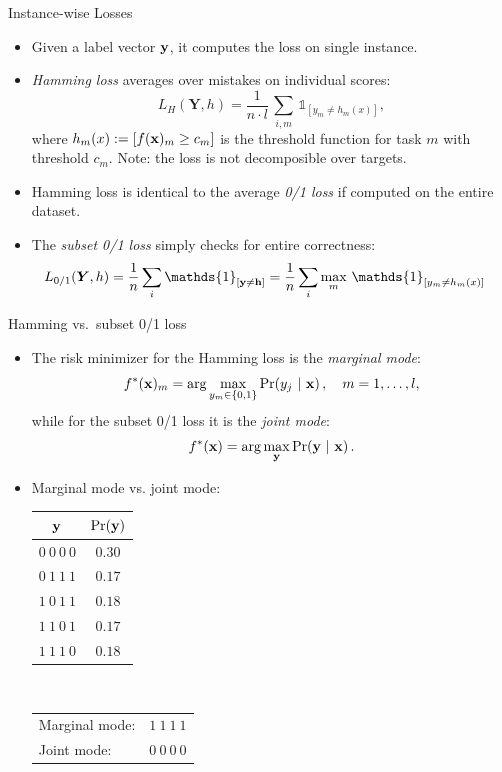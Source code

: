 \documentclass[11pt,compress,t,notes=noshow, xcolor=table]{beamer}
\begin{document}
\begin{frame}{Instance-wise Losses}
	\begin{itemize}
		
        \item Given a label vector $\mathbf{y}$, it computes the loss on single instance. 

		\item \emph{Hamming loss} averages over mistakes on individual scores:    
		$$
		\displaystyle L_H(\bm{Y}, h) = \frac{1}{n \cdot l}  \, \sum_{i, m} \, \mathds{1}_{[y_m \neq h_m(x)]},
		$$
        where $h_m(x) := [f(\mathbf{x})_m \geq c_m]$ is the threshold function for task $m$ with threshold $c_m$. Note: the loss is not decomposible over targets.
        
        \item Hamming loss is identical to the average \emph{0/1 loss} if computed on the entire dataset.

		
		\item The \emph{subset 0/1 loss} simply checks for entire correctness:  
		\begin{align*}
			\displaystyle L_{0/1}(\bm{Y}, h) & = \frac{1}{n} \sum_i \mathds{1}_{[ \yv \neq \mathbf{h} ]}  =  \frac{1}{n} \sum_i \max_m \, \mathds{1}_{[y_m \neq  h_m(x)]}
		\end{align*}
		
	\end{itemize}
\end{frame}


\begin{frame}{Hamming vs.\ subset 0/1 loss}
	\begin{itemize}
		\item The risk minimizer for the Hamming loss is the  \emph{marginal mode}:
		$$
		f^*(\mathbf{x})_m = \arg \max_{y_m \in \{0,1\}} \Pr( y_j  ~|~ \mathbf{x} )\,, \quad m = 1,\ldots,l,
		$$
		while for the subset 0/1 loss it is the \emph{joint mode}:
		$$
		f^*(\mathbf{x}) = \arg \max_{\mathbf{y}} \Pr(\mathbf{y} ~|~ \mathbf{x}) \,.
		$$
		\item Marginal mode vs. joint mode:\\[6pt]
		\begin{center}
			\begin{tabular}{@{}cc@{}}
				\toprule
				$\mathbf{y}$ & $\Pr(\mathbf{y})$ \\
				\hline
				$0~0~0~0$ & $0.30$ \\
				$0~1~1~1$ & $0.17$ \\
				$1~0~1~1$ & $0.18$ \\
				$1~1~0~1$ & $0.17$ \\
				$1~1~1~0$ & $0.18$ \\
				\toprule
			\end{tabular}
			$\qquad$
			\footnotesize{
				\begin{tabular}{lr}
					Marginal mode: & $1~1~1~1$ \\
					Joint mode: & $0~0~0~0$ \\
				\end{tabular}
			}
		\end{center}
	\end{itemize}
\end{frame}
\end{document}
